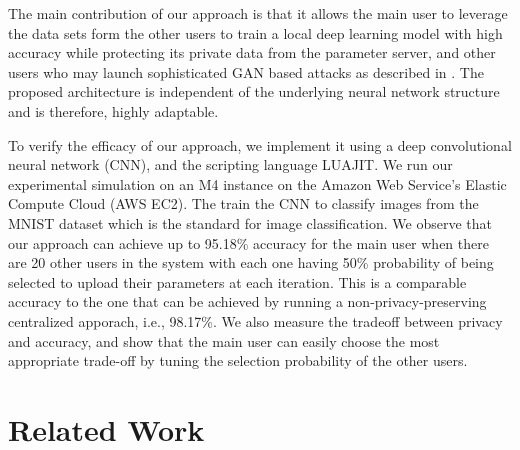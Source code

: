 \documentclass[conference]{IEEEtran}
\begin{document}
The main contribution of our approach is that it allows the main user to leverage the data sets form the other users to train a local
deep learning model with high accuracy while protecting its private data from the parameter server, and other users who
may launch sophisticated GAN based attacks as described in \cite{hitaj2017deep}. The proposed architecture is independent of the
underlying neural network structure and is therefore, highly adaptable.


To verify the efficacy of our approach, we implement it using a deep convolutional neural network (CNN), and the scripting language
LUAJIT. We run our experimental simulation on an  M4 instance on the Amazon Web Service's Elastic Compute Cloud (AWS EC2).  The train
the CNN to classify images from the MNIST dataset which is the standard for image classification.
We observe that our approach can achieve up to 95.18\%  accuracy for the main user when there are 20 other users in the
system with each one having 50\% probability of being selected to upload their parameters at each iteration. 
This is a comparable accuracy to the one that can be achieved by running a non-privacy-preserving centralized apporach, i.e.,  98.17\%.
We also measure the tradeoff between privacy and accuracy, and show that the main user can easily choose the most appropriate
trade-off by tuning the selection probability of the other users. 


\section{Related Work}
\end{document}
